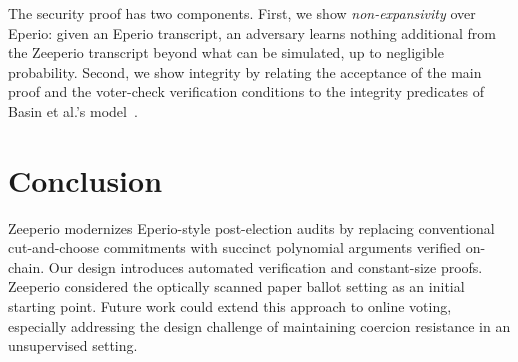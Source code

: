 The security proof has two components. First, we show \emph{non-expansivity} over Eperio: given an Eperio transcript, an adversary
learns nothing additional from the Zeeperio transcript beyond what can be simulated, up to negligible
probability. Second, we show integrity by relating the acceptance of the main proof and the voter-check
verification conditions to the integrity predicates of Basin et al.'s model~\cite{BDGR21}.


\section{Conclusion}
Zeeperio modernizes Eperio-style post-election audits by replacing conventional cut-and-choose commitments with succinct polynomial arguments verified on-chain. Our design introduces automated verification and constant-size proofs. Zeeperio considered the optically scanned paper ballot setting as an initial starting point. Future work could extend this approach to online voting, especially addressing the design challenge of maintaining coercion resistance in an unsupervised setting. 





